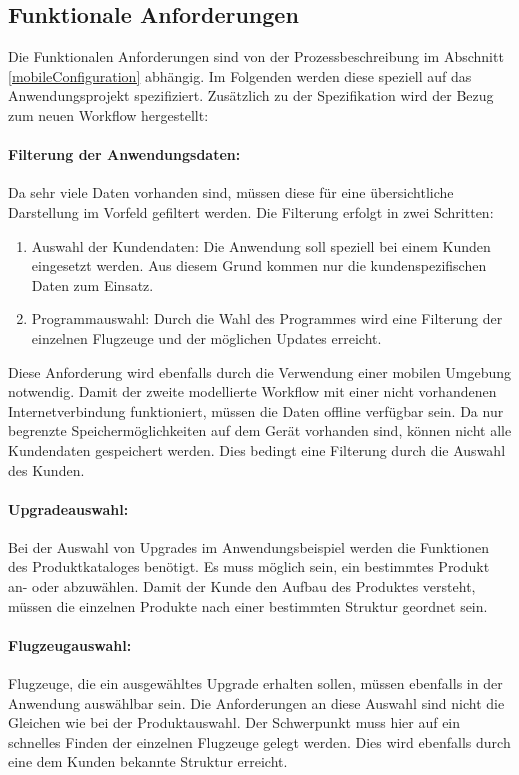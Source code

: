 \subsection{Funktionale Anforderungen}\label{functionRequ}
Die Funktionalen Anforderungen sind von der Prozessbeschreibung im Abschnitt \ref{mobileConfiguration} abhängig. Im Folgenden werden diese speziell auf das Anwendungsprojekt spezifiziert. Zusätzlich zu der Spezifikation wird der Bezug zum neuen Workflow hergestellt:

\paragraph{Filterung der Anwendungsdaten: } Da sehr viele Daten vorhanden sind, müssen diese für eine übersichtliche Darstellung im Vorfeld gefiltert werden. Die Filterung erfolgt in zwei Schritten:
\begin{enumerate}
\item Auswahl der Kundendaten: Die Anwendung soll speziell bei einem Kunden eingesetzt werden. Aus diesem Grund kommen nur die kundenspezifischen Daten zum Einsatz.
\item Programmauswahl: Durch die Wahl des Programmes wird eine Filterung der einzelnen Flugzeuge und der möglichen Updates erreicht.
\end{enumerate}
Diese Anforderung wird ebenfalls durch die Verwendung einer mobilen Umgebung notwendig. Damit der zweite modellierte Workflow mit einer nicht vorhandenen Internetverbindung funktioniert, müssen die Daten offline verfügbar sein. Da nur begrenzte Speichermöglichkeiten auf dem Gerät vorhanden sind, können nicht alle Kundendaten gespeichert werden. Dies bedingt eine Filterung durch die Auswahl des Kunden.

\paragraph{Upgradeauswahl: } Bei der Auswahl von Upgrades im Anwendungsbeispiel werden die Funktionen des Produktkataloges benötigt. Es muss möglich sein, ein bestimmtes Produkt an- oder abzuwählen. Damit der Kunde den Aufbau des Produktes versteht, müssen die einzelnen Produkte nach einer bestimmten Struktur geordnet sein. 

\paragraph{Flugzeugauswahl: } Flugzeuge, die ein ausgewähltes Upgrade erhalten sollen, müssen ebenfalls in der Anwendung auswählbar sein. Die Anforderungen an diese Auswahl sind nicht die Gleichen wie bei der Produktauswahl. Der Schwerpunkt muss hier auf ein schnelles Finden der einzelnen Flugzeuge gelegt werden. Dies wird ebenfalls durch eine dem Kunden bekannte Struktur erreicht. 


